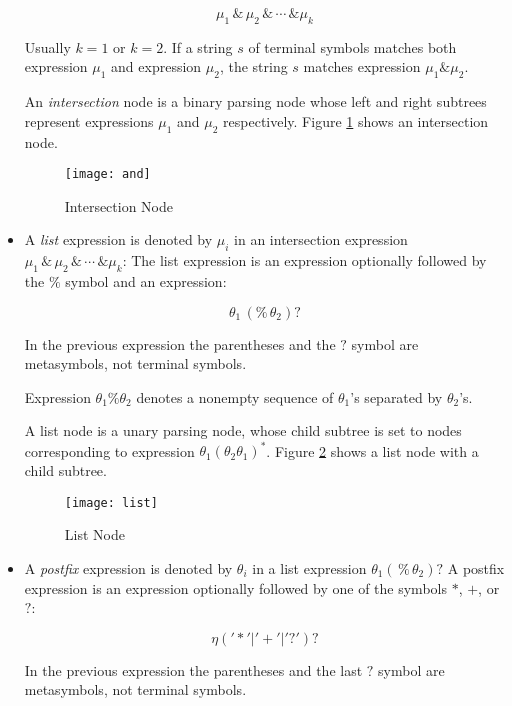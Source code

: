 \documentclass[a4paper,oneside,11pt]{book}
\theoremstyle{definition}
\begin{document}
\begin{itemize}
$$\mu_1 \, \& \, \mu_2 \, \& \, \cdots \, \& \mu_k$$

Usually $k = 1$ or $k = 2$.
If a string $s$ of terminal symbols matches both expression $\mu_1$ and expression $\mu_2$, the string $s$ matches expression $\mu_1 \& \mu_2$.

An \emph{intersection} node is a binary parsing node whose left and right subtrees represent expressions $\mu_1$ and $\mu_2$ respectively.
Figure \ref{fig:and} shows an intersection node.

\begin{figure}[htb]
\caption{Intersection Node}
\label{fig:and}
\vspace{0.5cm}
\begin{center}
\texttt{[image: and]}
\end{center}
\end{figure}

\clearpage
\item
A \emph{list} expression is denoted by $\mu_i$ in an intersection expression $\mu_1 \, \& \, \mu_2 \, \& \, \cdots \, \& \mu_k$:
The list expression is an expression optionally followed by the $\%$ symbol and an expression:

$$\theta_1 \, (\% \, \theta_2)?$$

In the previous expression the parentheses and the $?$ symbol are metasymbols, not terminal symbols.

Expression $\theta_1 \% \theta_2$ denotes a nonempty sequence of $\theta_1$'s separated by $\theta_2$'s.

A list node is a unary parsing node, whose child subtree is set to nodes corresponding to expression
$\theta_1 (\theta_2 \theta_1)^*$. Figure \ref{fig:list} shows a list node with a child subtree.

\begin{figure}[htb]
\caption{List Node}
\label{fig:list}
\vspace{0.5cm}
\begin{center}
\texttt{[image: list]}
\end{center}
\end{figure}

\item
A \emph{postfix} expression is denoted by $\theta_i$ in a list expression $\theta_1 (\, \% \, \theta_2)?$
A postfix expression is an expression optionally followed by one of the symbols $*$, $+$, or $?$:

$$\eta ('*' | '+' | '?')?$$

In the previous expression the parentheses and the last $?$ symbol are metasymbols, not terminal symbols.


\end{itemize}
\end{document}
